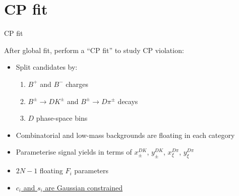 \documentclass{beamer}
\begin{document}
\section{CP fit}
\begin{frame}{CP fit}
  \begin{center}
    {\large After global fit, perform a ``CP fit'' to study CP violation:}
  \end{center}
  \begin{itemize}
    \setlength\itemsep{1.0em}
    \item{Split candidates by:}
    \begin{enumerate}
      \item{$B^+$ and $B^-$ charges}
      \item{$B^\pm\to DK^\pm$ and $B^\pm\to D\pi^\pm$ decays}
      \item{$D$ phase-space bins}
    \end{enumerate}
    \item{Combinatorial and low-mass backgrounds are floating in each category}
    \item{Parameterise signal yields in terms of $x_\pm^{DK}$, $y_\pm^{DK}$, $x_\xi^{D\pi}$, $y_\xi^{D\pi}$}
    \item{$2N - 1$ floating $F_i$ parameters}
    \item{\underline{$c_i$ and $s_i$ are Gaussian constrained}}
  \end{itemize}
\end{frame}
\end{document}
